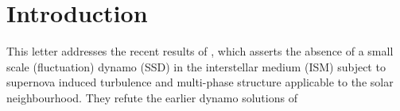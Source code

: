 \documentclass[preprint2]{aastex63}
\newcommand\aastex{AAS\TeX}
\newcommand\latex{La\TeX}
\begin{document}
\section{Introduction} \label{sec:intro}

This letter addresses the recent results of \citet{GE20}, which asserts the 
absence of a small scale (fluctuation) dynamo (SSD) in the interstellar medium
(ISM) subject to supernova induced turbulence and multi-phase structure
applicable to the solar neighbourhood. 
They refute the earlier dynamo solutions of \citet{BKMM04}

%
%
%
\end{document}
